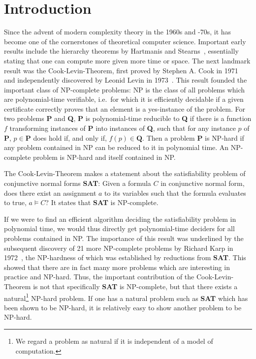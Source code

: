 \chapter{Introduction}\label{chap:introduction}
\newcommand{\SAT}{\textbf{SAT}}
\newcommand{\Clique}{\textbf{Clique}}
\newcommand{\NP}{\textsf{NP}}
\newcommand{\PC}{\textsf{P}}

Since the advent of modern complexity theory in the 1960s and -70s, it has become one of the cornerstones of theoretical computer science. 
Important early results include the hierarchy theorems by Hartmanis and Stearns~\cite{hartmanis_stearns}, essentially stating that one can compute more given more time or space. 
The next landmark result was the Cook-Levin-Theorem, first proved by Stephen A. Cook in 1971~\cite{cook_theorem} and independently discovered by Leonid Levin in 1973~\cite{levin_theorem}. 
This result founded the important class of \NP{}-complete problems: \NP{} is the class of all problems which are polynomial-time verifiable, i.e.\ for which it is efficiently decidable if a given certificate correctly proves that an element is a yes-instance of the problem. For two problems \textbf{P} and \textbf{Q}, \textbf{P} is polynomial-time reducible to \textbf{Q} if there is a function $f$ transforming instances of \textbf{P} into instances of \textbf{Q}, such that for any instance $p$ of \textbf{P}, $p \in \textbf{P}$ does hold if, and only if, $f(p) \in \textbf{Q}$. 
Then a problem \textbf{P} is \NP{}-hard if any problem contained in \NP{} can be reduced to it in polynomial time. An \NP{}-complete problem is \NP{}-hard and itself contained in \NP{}.  

The Cook-Levin-Theorem makes a statement about the satisfiability problem of conjunctive normal forms \SAT{}: 
Given a formula $C$ in conjunctive normal form, does there exist an assignment $a$ to its variables such that the formula evaluates to \textsf{true}, $a \models C$?
It states that \SAT{} is \NP{}-complete. 

If we were to find an efficient algorithm deciding the satisfiability problem in polynomial time, we would thus directly get polynomial-time deciders for all problems contained in \NP{}. 
The importance of this result was underlined by the subsequent discovery of 21 more \NP{}-complete problems by Richard Karp in 1972~\cite{Karp1972}, the \NP{}-hardness of which was established by reductions from \textbf{SAT}. This showed that there are in fact many more problems which are interesting in practice and \NP{}-hard. 
Thus, the important contribution of the Cook-Levin-Theorem is not that specifically \SAT{} is \NP{}-complete, but that there exists a natural\footnote{We regard a problem as natural if it is independent of a model of computation.} \NP{}-hard problem. If one has a natural problem such as \SAT{} which has been shown to be \NP{}-hard, it is relatively easy to show another problem to be \NP{}-hard.

